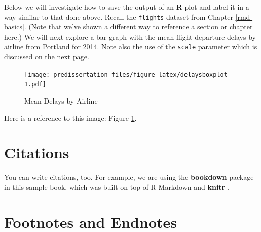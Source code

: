 \documentclass[12pt,letterpaper,oneside,oldfontcommands]{memoir}
\newenvironment{Shaded}{\begin{snugshade}}{\end{snugshade}}
\newcommand{\DataTypeTok}[1]{\textcolor[rgb]{0.13,0.29,0.53}{#1}}
\newcommand{\KeywordTok}[1]{\textcolor[rgb]{0.13,0.29,0.53}{\textbf{#1}}}
\newcommand{\NormalTok}[1]{#1}
\newcommand{\OperatorTok}[1]{\textcolor[rgb]{0.81,0.36,0.00}{\textbf{#1}}}
\newcommand{\StringTok}[1]{\textcolor[rgb]{0.31,0.60,0.02}{#1}}
\theoremstyle{definition}
\theoremstyle{definition}
\theoremstyle{definition}
\theoremstyle{remark}
\begin{document}
Below we will investigate how to save the output of an \textbf{R} plot
and label it in a way similar to that done above. Recall the
\texttt{flights} dataset from Chapter \ref{rmd-basics}. (Note that we've
shown a different way to reference a section or chapter here.) We will
next explore a bar graph with the mean flight departure delays by
airline from Portland for 2014. Note also the use of the \texttt{scale}
parameter which is discussed on the next page.

\begin{Shaded}
\end{Shaded}

\begin{figure}
\centering
\texttt{[image: predissertation\_files/figure-latex/delaysboxplot-1.pdf]}
\caption{\label{fig:delaysboxplot}Mean Delays by Airline}
\end{figure}

Here is a reference to this image: Figure \ref{fig:delaysboxplot}.

\clearpage

\hypertarget{citations}{%
\section{Citations}\label{citations}}

You can write citations, too. For example, we are using the
\textbf{bookdown} package \citep{R-bookdown} in this sample book, which
was built on top of R Markdown and \textbf{knitr} \citep{xie2015}.

\hypertarget{footnotes-and-endnotes}{%
\section{Footnotes and Endnotes}\label{footnotes-and-endnotes}}
\end{document}
